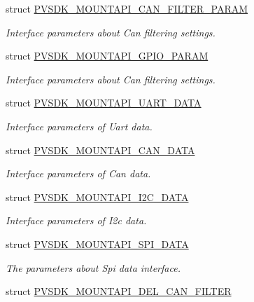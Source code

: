 \begin{DoxyCompactItemize}
struct \hyperlink{struct_p_v_s_d_k___m_o_u_n_t_a_p_i___c_a_n___f_i_l_t_e_r___p_a_r_a_m}{P\+V\+S\+D\+K\+\_\+\+M\+O\+U\+N\+T\+A\+P\+I\+\_\+\+C\+A\+N\+\_\+\+F\+I\+L\+T\+E\+R\+\_\+\+P\+A\+R\+AM}
\begin{DoxyCompactList}\small\item\em Interface parameters about Can filtering settings. \end{DoxyCompactList}\item 
struct \hyperlink{struct_p_v_s_d_k___m_o_u_n_t_a_p_i___g_p_i_o___p_a_r_a_m}{P\+V\+S\+D\+K\+\_\+\+M\+O\+U\+N\+T\+A\+P\+I\+\_\+\+G\+P\+I\+O\+\_\+\+P\+A\+R\+AM}
\begin{DoxyCompactList}\small\item\em Interface parameters about Can filtering settings. \end{DoxyCompactList}\item 
struct \hyperlink{struct_p_v_s_d_k___m_o_u_n_t_a_p_i___u_a_r_t___d_a_t_a}{P\+V\+S\+D\+K\+\_\+\+M\+O\+U\+N\+T\+A\+P\+I\+\_\+\+U\+A\+R\+T\+\_\+\+D\+A\+TA}
\begin{DoxyCompactList}\small\item\em Interface parameters of Uart data. \end{DoxyCompactList}\item 
struct \hyperlink{struct_p_v_s_d_k___m_o_u_n_t_a_p_i___c_a_n___d_a_t_a}{P\+V\+S\+D\+K\+\_\+\+M\+O\+U\+N\+T\+A\+P\+I\+\_\+\+C\+A\+N\+\_\+\+D\+A\+TA}
\begin{DoxyCompactList}\small\item\em Interface parameters of Can data. \end{DoxyCompactList}\item 
struct \hyperlink{struct_p_v_s_d_k___m_o_u_n_t_a_p_i___i2_c___d_a_t_a}{P\+V\+S\+D\+K\+\_\+\+M\+O\+U\+N\+T\+A\+P\+I\+\_\+\+I2\+C\+\_\+\+D\+A\+TA}
\begin{DoxyCompactList}\small\item\em Interface parameters of I2c data. \end{DoxyCompactList}\item 
struct \hyperlink{struct_p_v_s_d_k___m_o_u_n_t_a_p_i___s_p_i___d_a_t_a}{P\+V\+S\+D\+K\+\_\+\+M\+O\+U\+N\+T\+A\+P\+I\+\_\+\+S\+P\+I\+\_\+\+D\+A\+TA}
\begin{DoxyCompactList}\small\item\em The parameters about Spi data interface. \end{DoxyCompactList}\item 
struct \hyperlink{struct_p_v_s_d_k___m_o_u_n_t_a_p_i___d_e_l___c_a_n___f_i_l_t_e_r}{P\+V\+S\+D\+K\+\_\+\+M\+O\+U\+N\+T\+A\+P\+I\+\_\+\+D\+E\+L\+\_\+\+C\+A\+N\+\_\+\+F\+I\+L\+T\+ER}

\end{DoxyCompactItemize}

